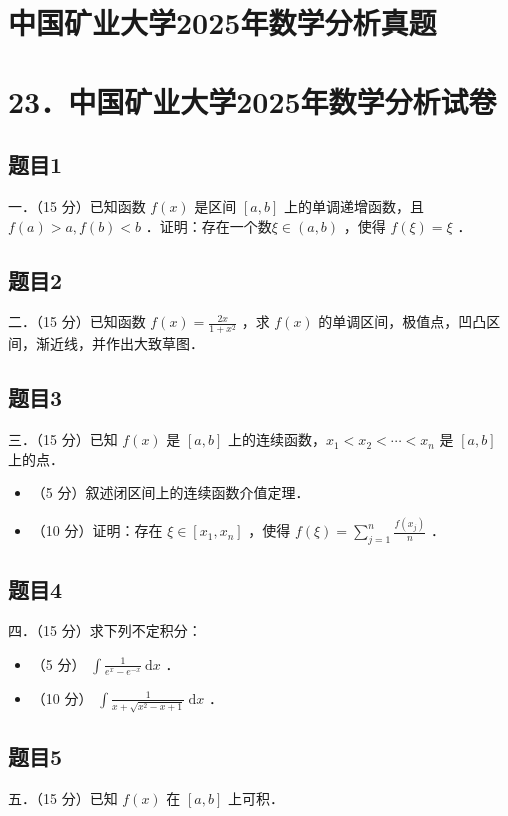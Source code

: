 \documentclass{article}
\begin{document}
\section*{中国矿业大学2025年数学分析真题}
\section*{23．中国矿业大学2025年数学分析试卷}

\subsection{题目1}
一．（15 分）已知函数 \(f(x)\) 是区间 \([a, b]\) 上的单调递增函数，且 \(f(a)>a, f(b)<b\) ．证明：存在一个数\(\xi \in(a, b)\) ，使得 \(f(\xi)=\xi\) ．

\subsection{题目2}
二．（15 分）已知函数 \(f(x)=\frac{2 x}{1+x^{2}}\) ，求 \(f(x)\) 的单调区间，极值点，凹凸区间，渐近线，并作出大致草图．

\subsection{题目3}
三．（15 分）已知 \(f(x)\) 是 \([a, b]\) 上的连续函数，\(x_{1}<x_{2}<\cdots<x_{n}\) 是 \([a, b]\) 上的点．

\begin{itemize}
  \item[（1）] （5 分）叙述闭区间上的连续函数介值定理．
  \item[（2）] （10 分）证明：存在 \(\xi \in\left[x_{1}, x_{n}\right]\) ，使得 \(f(\xi)=\sum_{j=1}^{n} \frac{f\left(x_{j}\right)}{n}\) ．
\end{itemize}

\subsection{题目4}
四．（15 分）求下列不定积分：

\begin{itemize}
  \item[（1）] （5 分） \(\int \frac{1}{e^{x}-e^{-x}} \mathrm{~d} x\) ．
  \item[（2）] （10 分） \(\int \frac{1}{x+\sqrt{x^{2}-x+1}} \mathrm{~d} x\) ．
\end{itemize}

\subsection{题目5}
五．（15 分）已知 \(f(x)\) 在 \([a, b]\) 上可积．
\end{document}
